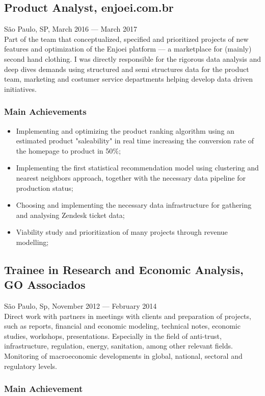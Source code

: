 \documentclass{article}
\newcommand{\jobdate}[3]{
\large
\vspace{0.05em} 
  {#1, #2 --- #3}
\vspace{0.5em} 
\\
}
\begin{document}
\subsection{Product Analyst, enjoei.com.br}
\jobdate{São Paulo, SP}{March 2016}{March 2017}
Part of the team that conceptualized, specified and prioritized projects of new features and optimization of the Enjoei platform --- a marketplace for (mainly) second hand clothing. I was directly responsible for the rigorous data analysis and deep dives demands using structured and semi structures data for the product team, marketing and costumer service departments helping develop data driven initiatives.
\subsubsection{Main Achievements}

\begin{itemize}

\item{Implementing and optimizing the product ranking algorithm using an estimated product "saleability" in real time increasing the conversion rate of the homepage to product in 50\%;}
\item{Implementing the first statistical recommendation model using clustering and nearest neighbors approach, together with the necessary data pipeline for production status;}
\item{Choosing and implementing the necessary data infrastructure for gathering and analysing Zendesk ticket data;}
\item{Viability study and prioritization of many projects through revenue modelling;}
\end{itemize}

\subsection{Trainee in Research and Economic Analysis, GO Associados}
\jobdate{São Paulo, Sp}{November 2012}{February 2014}
Direct work with partners in meetings with clients and preparation of projects, such as reports, financial and economic modeling, technical notes, economic studies, workshops, presentations. Especially in the field of anti-trust, infrastructure, regulation, energy, sanitation, among other relevant fields. Monitoring of macroeconomic developments in global, national, sectoral and regulatory levels.
\subsubsection{Main Achievement}
\end{document}
